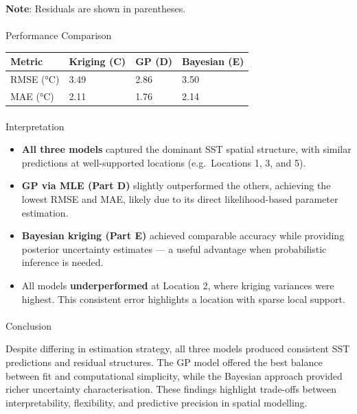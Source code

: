 \documentclass[
  11pt,
]{article}
\makeatletter
\let\oldparagraph\paragraph
\renewcommand{\paragraph}{
    \@ifstar
      \xxxParagraphStar
      \xxxParagraphNoStar
  }
\newcommand{\xxxParagraphStar}[1]{\oldparagraph*{#1}\mbox{}}
\newcommand{\xxxParagraphNoStar}[1]{\oldparagraph{#1}\mbox{}}
\makeatother
\begin{document}
\textbf{Note}: Residuals are shown in parentheses.

\paragraph{Performance Comparison}\label{performance-comparison}

\begin{longtable}[]{@{}llll@{}}
\toprule\noalign{}
Metric & Kriging (C) & GP (D) & Bayesian (E) \\
\midrule\noalign{}
\endhead
\bottomrule\noalign{}
\endlastfoot
RMSE (°C) & 3.49 & 2.86 & 3.50 \\
MAE (°C) & 2.11 & 1.76 & 2.14 \\
\end{longtable}

\paragraph{Interpretation}\label{interpretation-1}

\begin{itemize}
\item
  \textbf{All three models} captured the dominant SST spatial structure,
  with similar predictions at well-supported locations (e.g.~Locations
  1, 3, and 5).
\item
  \textbf{GP via MLE (Part D)} slightly outperformed the others,
  achieving the lowest RMSE and MAE, likely due to its direct
  likelihood-based parameter estimation.
\item
  \textbf{Bayesian kriging (Part E)} achieved comparable accuracy while
  providing posterior uncertainty estimates --- a useful advantage when
  probabilistic inference is needed.
\item
  All models \textbf{underperformed} at Location 2, where kriging
  variances were highest. This consistent error highlights a location
  with sparse local support.
\end{itemize}

\paragraph{Conclusion}\label{conclusion}

Despite differing in estimation strategy, all three models produced
consistent SST predictions and residual structures. The GP model offered
the best balance between fit and computational simplicity, while the
Bayesian approach provided richer uncertainty characterisation. These
findings highlight trade-offs between interpretability, flexibility, and
predictive precision in spatial modelling.
\end{document}
